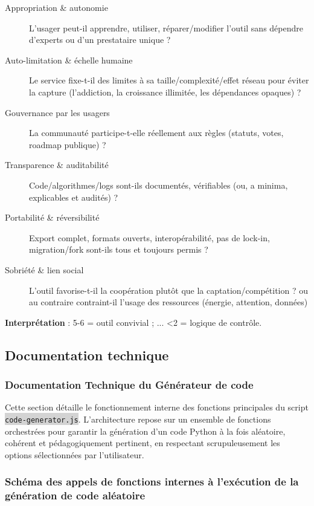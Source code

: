 \documentclass[11pt,a4paper]{article}
\newcommand{\code}[1]{\colorbox{lightgray}{\texttt{\small #1}}}
\begin{document}
\begin{description}
    \item[Appropriation \& autonomie] L’usager peut-il apprendre, utiliser, réparer/modifier l’outil sans dépendre d’experts ou d’un prestataire unique ?
    \item[Auto-limitation \& échelle humaine] Le service fixe-t-il des limites à sa taille/complexité/effet réseau pour éviter la capture (l'addiction, la croissance illimitée, les dépendances opaques) ?
    \item[Gouvernance par les usagers] La communauté participe-t-elle réellement aux règles (statuts, votes, roadmap publique) ?
    \item[Transparence \& auditabilité] Code/algorithmes/logs sont-ils documentés, vérifiables (ou, a minima, explicables et audités) ?
    \item[Portabilité \& réversibilité] Export complet, formats ouverts, interopérabilité, pas de lock-in, migration/fork sont-ils tous et toujours permis ?
    \item[Sobriété \& lien social] L'outil favorise-t-il la coopération plutôt que la captation/compétition ? ou au contraire contraint-il l’usage des ressources (énergie, attention, données)
\end{description}

\textbf{Interprétation} : 5-6 = outil convivial ; ... <2 = logique de contrôle.


\subsection{Documentation technique}

\subsubsection{Documentation Technique du Générateur de code}
Cette section détaille le fonctionnement interne des fonctions principales du script \code{code-generator.js}. L'architecture repose sur un ensemble de fonctions orchestrées pour garantir la génération d'un code Python à la fois aléatoire, cohérent et pédagogiquement pertinent, en respectant scrupuleusement les options sélectionnées par l'utilisateur.

\subsubsection*{Schéma des appels de fonctions internes à l'exécution de la génération de code aléatoire}
\end{document}
